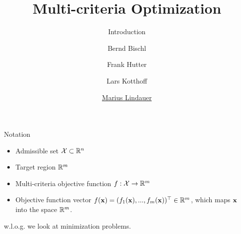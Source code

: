 

\newcommand{\a}[0]{\mathbf{a}}
\newcommand{\y}[0]{\mathbf{y}}
\newcommand{\q}[0]{\mathbf{q}}
\newcommand{\Xspace}[0]{\mathcal{X}}

\title[AutoML: Overview]{Multi-criteria Optimization}
\subtitle{Introduction}
\author[Bernd Bischl]{Bernd Bischl \and Frank Hutter \and Lars Kotthoff \and \underline{Marius Lindauer}}
\institute{}
\date{}






	\maketitle


\begin{frame}{Notation}

\begin{itemize}
\item Admissible set $\Xspace \subset \realnum^n$
\item Target region $\mathbb{R}^m$
\item Multi-criteria objective function $f: \Xspace \to \realnum^m$
\item Objective function vector $f(\mathbf{x}) = \left(f_1(\mathbf{x}), ..., f_m(\mathbf{x}\right))^\top \in \mathbb{R}^m$, which maps $\mathbf{x}$ into the space $\mathbb{R}^m$.
\end{itemize}

w.l.o.g. we look at minimization problems.

\end{frame}

